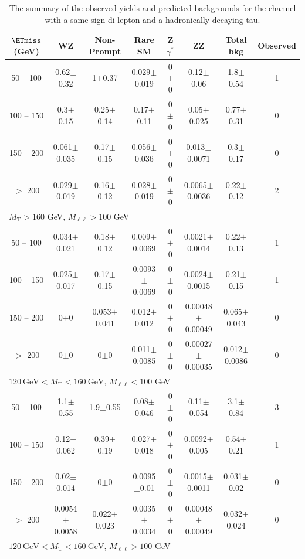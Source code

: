 \begin{landscape}
\begin{table}
\begin{center}
\caption{\label{tab:SStau1} The summary of the observed yields and predicted backgrounds for the channel 
with a same sign di-lepton and a hadronically decaying tau. }
\begin{tabular}{| c | c c c c c c c | }\hline\hline
$\ETmiss$ (GeV) & WZ & Non-Prompt & Rare SM & Z$\gamma^*$ & ZZ & Total bkg & Observed\\\hline\hline
50 -- 100&0.62$\pm$0.32&1$\pm$0.37&0.029$\pm$0.019&0$\pm$0&0.12$\pm$0.06&1.8$\pm$0.54&1\\
100 -- 150&0.3$\pm$0.15&0.25$\pm$0.14&0.17$\pm$0.11&0$\pm$0&0.05$\pm$0.025&0.77$\pm$0.31&0\\
150 -- 200&0.061$\pm$0.035&0.17$\pm$0.15&0.056$\pm$0.036&0$\pm$0&0.013$\pm$0.0071&0.3$\pm$0.17&0\\
$>$ 200&0.029$\pm$0.019&0.16$\pm$0.12&0.028$\pm$0.019&0$\pm$0&0.0065$\pm$0.0036&0.22$\pm$0.12&2\\
\hline\hline
\multicolumn{8}{l}{$M_{\text{T}} > 160$ GeV, $M_{\ell\ell} > 100$ GeV}\\\hline\hline
50 -- 100&0.034$\pm$0.021&0.18$\pm$0.12&0.009$\pm$0.0069&0$\pm$0&0.0021$\pm$0.0014&0.22$\pm$0.13&1\\
100 -- 150&0.025$\pm$0.017&0.17$\pm$0.15&0.0093$\pm$0.0069&0$\pm$0&0.0024$\pm$0.0015&0.21$\pm$0.15&1\\
150 -- 200&0$\pm$0&0.053$\pm$0.041&0.012$\pm$0.012&0$\pm$0&0.00048$\pm$0.00049&0.065$\pm$0.043&0\\
$>$ 200&0$\pm$0&0$\pm$0&0.011$\pm$0.0085&0$\pm$0&0.00027$\pm$0.00035&0.012$\pm$0.0086&0\\
\hline\hline
\multicolumn{8}{l}{$120~\mathrm{GeV} < M_{\text{T}} < 160~\mathrm{GeV}$, $M_{\ell\ell} < 100$ GeV}\\\hline\hline
50 -- 100&1.1$\pm$0.55&1.9$\pm$0.55&0.08$\pm$0.046&0$\pm$0&0.11$\pm$0.054&3.1$\pm$0.84&3\\
100 -- 150&0.12$\pm$0.062&0.39$\pm$0.19&0.027$\pm$0.018&0$\pm$0&0.0092$\pm$0.005&0.54$\pm$0.21&1\\
150 -- 200&0.02$\pm$0.014&0$\pm$0&0.0095$\pm$0.01&0$\pm$0&0.0015$\pm$0.0011&0.031$\pm$0.02&0\\
$>$ 200&0.0054$\pm$0.0058&0.022$\pm$0.023&0.0035$\pm$0.0034&0$\pm$0&0.00048$\pm$0.00049&0.032$\pm$0.024&0\\
\hline\hline
\multicolumn{8}{l}{$120~\mathrm{GeV} < M_{\text{T}} < 160~\mathrm{GeV}$, $M_{\ell\ell} > 100$ GeV}\\\hline\hline

\end{tabular}
\end{center}
\end{table}
\end{landscape}
